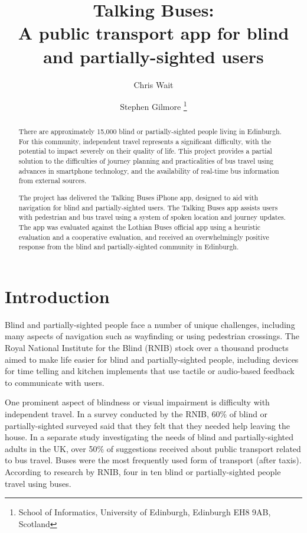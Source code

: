 \documentclass[10pt,twocolumn]{article}
\newcommand{\citep}[1]{}
\begin{document}
\title{Talking Buses:\\ A public transport app for blind and partially-sighted users}
\author{Chris Wait \and
Stephen Gilmore
\thanks{School of Informatics, University of Edinburgh, Edinburgh EH8 9AB, Scotland}
}

\maketitle


\begin{abstract}
There are approximately 15,000 blind or partially-sighted people living in Edinburgh. For this community, independent travel represents a significant difficulty, with the potential to impact severely on their quality of life. This project provides a partial solution to the difficulties of journey planning and practicalities of bus travel using advances in smartphone technology, and the availability of real-time bus information from external sources.

The project has delivered the Talking Buses iPhone app, designed to aid with navigation for blind and partially-sighted users. The Talking Buses app assists users with pedestrian and bus travel using a system of spoken location and journey updates. The app was evaluated against the Lothian Buses official app using a heuristic evaluation and a cooperative evaluation, and received an overwhelmingly positive response from the blind and partially-sighted community in Edinburgh.
\end{abstract}



\section{Introduction}

Blind and partially-sighted people face a number of unique challenges, including many aspects of navigation such as wayfinding\citep{wayfinding} or using pedestrian crossings\citep{neatebox}. The Royal National Institute for the Blind (RNIB) stock over a thousand products aimed to make life easier for blind and partially-sighted people, including devices for time telling and kitchen implements that use tactile or audio-based feedback to communicate with users\citep{sightProblemsGuide}.

One prominent aspect of blindness or visual impairment is difficulty with independent travel.  In a survey conducted by the RNIB, 60\% of blind or partially-sighted surveyed said that they felt that they needed help leaving the house\citep{shaping}.  In a separate study investigating the needs of blind and partially-sighted adults in the UK, over 50\% of suggestions received about public transport related to bus travel. Buses were the most frequently used form of transport (after taxis)\citep{executive}. According to research by RNIB, four in ten blind or partially-sighted people travel using buses\citep{stopForMe}.
\end{document}
